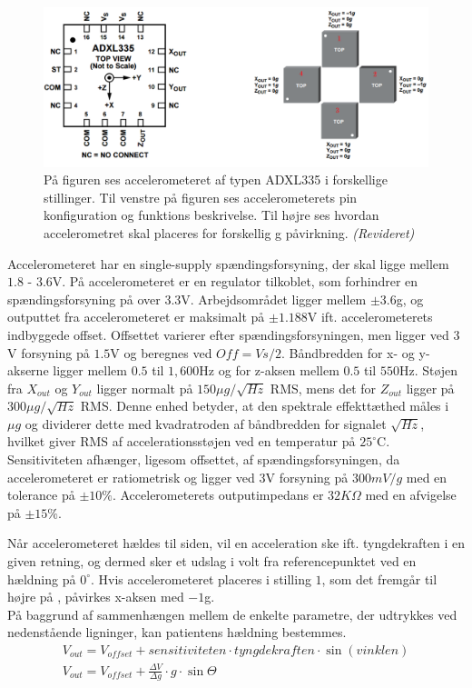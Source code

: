 \begin{figure}[H]
	\centering 
	\includegraphics[scale=0.5]{figures/cProblemloesning/ADXL335_2.JPG}
	\caption{På figuren ses accelerometeret af typen ADXL335 i forskellige stillinger. Til venstre på figuren ses accelerometerets pin konfiguration og funktions beskrivelse. Til højre ses hvordan accelerometret skal placeres for forskellig g påvirkning. \textit{(Revideret)} \cite{Devices2009}}
	\label{ADXL335}
\end{figure}

\noindent Accelerometeret har en single-supply spændingsforsyning, der skal ligge mellem $1.8$ - $3.6$V. På accelerometeret er en regulator tilkoblet, som forhindrer en spændingsforsyning på over $3.3$V.  Arbejdsområdet ligger mellem $\pm3.6$g, og outputtet fra accelerometeret er maksimalt på $\pm1.188$V ift. accelerometerets indbyggede offset. Offsettet varierer efter spændingsforsyningen, men ligger ved $3$V forsyning på $1.5$V og beregnes ved $Off = Vs/2$. Båndbredden for x- og y-akserne ligger mellem $0.5$ til $1,600$Hz og for z-aksen mellem $0.5$ til $550$Hz. Støjen fra $X_{out}$ og $Y_{out}$ ligger normalt på $150\mu g/\sqrt{Hz}$ RMS, mens det for $Z_{out}$ ligger på $300\mu g/\sqrt{Hz}$ RMS. Denne enhed betyder, at den spektrale effekttæthed måles i $\mu g$ og dividerer dette med kvadratroden af båndbredden for signalet $\sqrt{Hz}$, hvilket giver RMS af accelerationsstøjen ved en temperatur på $25^\circ$C. Sensitiviteten afhænger, ligesom offsettet, af spændingsforsyningen, da accelerometeret er ratiometrisk og ligger ved $3$V forsyning på $300 mV/g$ med en tolerance på $\pm10\%$. Accelerometerets outputimpedans er $32K\Omega$ med en afvigelse på $\pm15\%$. \cite{Devices2009} %

Når accelerometeret hældes til siden, vil en acceleration ske ift. tyngdekraften i en given retning, og dermed sker et udslag i volt fra referencepunktet ved en hældning på $0^{\circ}$. Hvis accelerometeret placeres i stilling $1$, som det fremgår til højre på , påvirkes x-aksen med $-1$g.\cite{Devices2009} \\
På baggrund af sammenhængen mellem de enkelte parametre, der udtrykkes ved nedenstående ligninger, kan patientens hældning bestemmes.
\begin{align}
	V_{out} = V_{offset} + sensitiviteten \cdot tyngdekraften \cdot \sin(vinklen) \\
	V_{out} = V_{offset} + \frac{\Delta V}{\Delta g} \cdot g \cdot \sin \Theta
\end{align}

